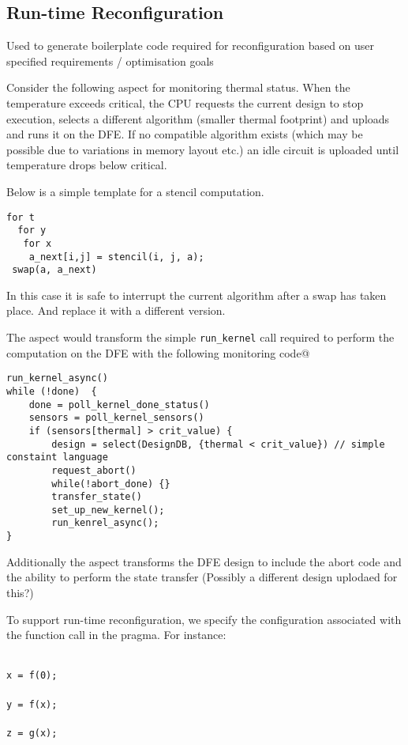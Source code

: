 \subsection{Run-time Reconfiguration}
\label{sect:asp_reconfig}


Used to generate boilerplate code required for reconfiguration based
on user specified requirements / optimisation goals

Consider the following aspect for monitoring thermal status. When the
temperature exceeds critical, the CPU requests the current design to
stop execution, selects a different algorithm (smaller thermal
footprint) and uploads and runs it on the DFE. If no compatible
algorithm exists (which may be possible due to variations in memory
layout etc.) an idle circuit is uploaded until temperature drops below
critical.

Below is a simple template for a stencil computation.

\begin{lstlisting}
for t
  for y
   for x
    a_next[i,j] = stencil(i, j, a);
 swap(a, a_next)
\end{lstlisting}

In this case it is safe to interrupt the current algorithm after a
swap has taken place. And replace it with a different version.

The aspect would transform the simple \texttt{run\_kernel} call required to
perform the computation on the DFE with the following monitoring code@

\begin{lstlisting}
run_kernel_async()
while (!done)  {
	done = poll_kernel_done_status()
	sensors = poll_kernel_sensors()
	if (sensors[thermal] > crit_value) {
		design = select(DesignDB, {thermal < crit_value}) // simple constaint language
		request_abort()
		while(!abort_done) {}
		transfer_state()
		set_up_new_kernel();
		run_kenrel_async();
}
\end{lstlisting}

Additionally the aspect transforms the DFE design to include the abort code and the ability to perform the state transfer (Possibly a different design uplodaed for this?)

To support run-time reconfiguration, we specify the configuration
associated with the function call in the \FAST{} pragma. For instance:


\noindent\texttt{\footnotesize{\\
x = f(0); \\
\\
y = f(x); \\
\\
z = g(x); \\
}}

